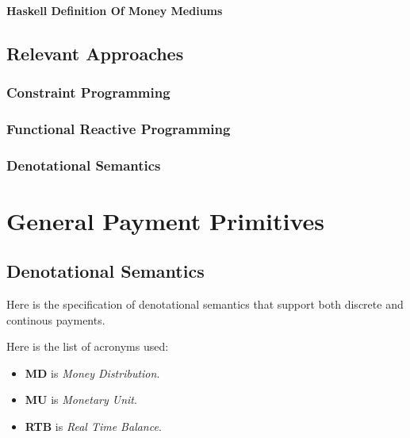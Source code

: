 \documentclass[a4paper,10pt]{report}
\begin{document}
\subsubsection{Haskell Definition Of Money Mediums}




\section{Relevant Approaches}

\subsection{Constraint Programming}

\subsection{Functional Reactive Programming}

\subsection{Denotational Semantics}

\chapter{General Payment Primitives}

\section{Denotational Semantics}

Here is the specification of denotational semantics that support both discrete and continous payments.

Here is the list of acronyms used:

\begin{itemize}
    \item \textbf{MD} is \textit{Money Distribution}.
    \item \textbf{MU} is \textit{Monetary Unit}.
    \item \textbf{RTB} is \textit{Real Time Balance}.
\end{itemize}
\end{document}
